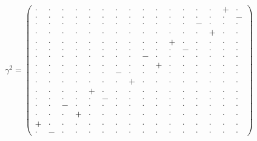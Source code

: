 \documentclass[
  10pt,
]{article}
\begin{document}
\[\gamma^2=\left(\begin{smallmatrix} \cdot & \cdot & \cdot & \cdot & \cdot & \cdot & \cdot & \cdot & \cdot & \cdot & \cdot & \cdot & \cdot & \cdot & + & \cdot \\ \cdot & \cdot & \cdot & \cdot & \cdot & \cdot & \cdot & \cdot & \cdot & \cdot & \cdot & \cdot & \cdot & \cdot & \cdot & - \\ \cdot & \cdot & \cdot & \cdot & \cdot & \cdot & \cdot & \cdot & \cdot & \cdot & \cdot & \cdot & - & \cdot & \cdot & \cdot \\ \cdot & \cdot & \cdot & \cdot & \cdot & \cdot & \cdot & \cdot & \cdot & \cdot & \cdot & \cdot & \cdot & + & \cdot & \cdot \\ \cdot & \cdot & \cdot & \cdot & \cdot & \cdot & \cdot & \cdot & \cdot & \cdot & + & \cdot & \cdot & \cdot & \cdot & \cdot \\ \cdot & \cdot & \cdot & \cdot & \cdot & \cdot & \cdot & \cdot & \cdot & \cdot & \cdot & - & \cdot & \cdot & \cdot & \cdot \\ \cdot & \cdot & \cdot & \cdot & \cdot & \cdot & \cdot & \cdot & - & \cdot & \cdot & \cdot & \cdot & \cdot & \cdot & \cdot \\ \cdot & \cdot & \cdot & \cdot & \cdot & \cdot & \cdot & \cdot & \cdot & + & \cdot & \cdot & \cdot & \cdot & \cdot & \cdot \\ \cdot & \cdot & \cdot & \cdot & \cdot & \cdot & - & \cdot & \cdot & \cdot & \cdot & \cdot & \cdot & \cdot & \cdot & \cdot \\ \cdot & \cdot & \cdot & \cdot & \cdot & \cdot & \cdot & + & \cdot & \cdot & \cdot & \cdot & \cdot & \cdot & \cdot & \cdot \\ \cdot & \cdot & \cdot & \cdot & + & \cdot & \cdot & \cdot & \cdot & \cdot & \cdot & \cdot & \cdot & \cdot & \cdot & \cdot \\ \cdot & \cdot & \cdot & \cdot & \cdot & - & \cdot & \cdot & \cdot & \cdot & \cdot & \cdot & \cdot & \cdot & \cdot & \cdot \\ \cdot & \cdot & - & \cdot & \cdot & \cdot & \cdot & \cdot & \cdot & \cdot & \cdot & \cdot & \cdot & \cdot & \cdot & \cdot \\ \cdot & \cdot & \cdot & + & \cdot & \cdot & \cdot & \cdot & \cdot & \cdot & \cdot & \cdot & \cdot & \cdot & \cdot & \cdot \\ + & \cdot & \cdot & \cdot & \cdot & \cdot & \cdot & \cdot & \cdot & \cdot & \cdot & \cdot & \cdot & \cdot & \cdot & \cdot \\ \cdot & - & \cdot & \cdot & \cdot & \cdot & \cdot & \cdot & \cdot & \cdot & \cdot & \cdot & \cdot & \cdot & \cdot & \cdot \end{smallmatrix}\right)\qquad
\]
\end{document}
